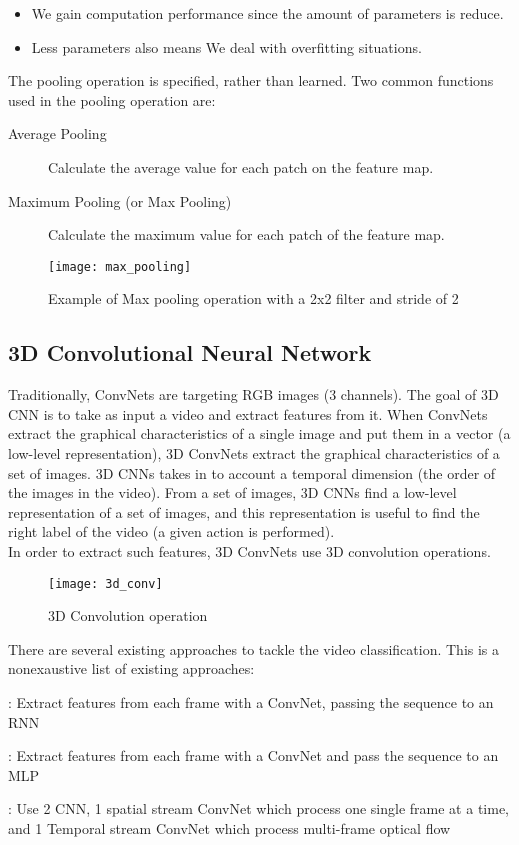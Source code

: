 \begin{itemize}
\item We gain computation performance since the amount of parameters is reduce.
\item Less parameters also means We deal with overfitting situations.
\end{itemize}

The pooling operation is specified, rather than learned. Two common functions used in the pooling operation are:
\begin{description}
\item[ Average Pooling ] Calculate the average value for each patch on the feature map.
\item[ Maximum Pooling (or Max Pooling) ] Calculate the maximum value for each patch of the feature map.
\end{description}

\begin{figure}[h]
  \centering
  \texttt{[image: max\_pooling]}
  \caption{Example of Max pooling operation with a 2x2 filter  and stride of 2}
  \label{fig:pooling_eg}
\end{figure}

\subsection{3D Convolutional Neural Network}
Traditionally, ConvNets are targeting RGB images (3 channels). The goal of 3D CNN is to take as input a video and extract features from it.
When ConvNets extract the graphical characteristics of a single image and put them in a vector (a low-level representation), 3D ConvNets
extract the graphical characteristics of a set of images. 3D CNNs takes in to account a temporal dimension (the order of the images in the
video). From a set of images, 3D CNNs find a low-level representation of a set of images, and this representation is useful to find the
right label of the video (a given action is performed). \\
In order to extract such features, 3D ConvNets  use 3D convolution operations.
\begin{figure}[h]
  \centering
  \texttt{[image: 3d\_conv]}
  \caption{3D Convolution operation}
\end{figure}

There are several existing approaches to tackle the video classification. This is a nonexaustive list of existing approaches:
\begin{description} [font=$\bullet$\scshape\bfseries]
\item[ ConvNets + LSTM cell] : Extract features from each frame with a ConvNet, passing the sequence to an RNN
\item[ Temporal Relation Networks] : Extract features from each frame with a ConvNet and pass the sequence to an MLP
\item[ Two-Stream Convolutional Networks] : Use 2 CNN, 1 spatial stream ConvNet which process one single frame at a time, and 1 Temporal stream ConvNet which process multi-frame optical flow
\end{description}


